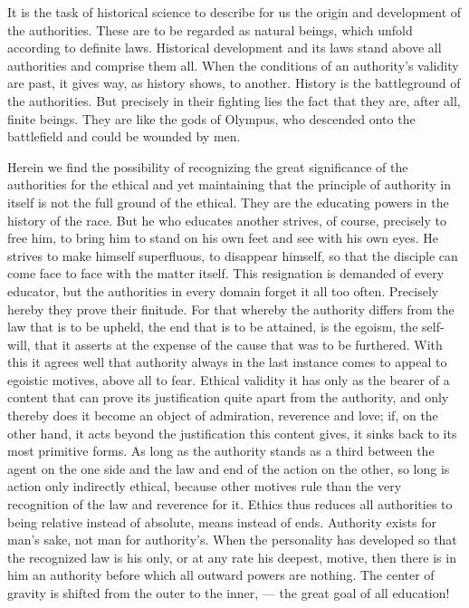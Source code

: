 \documentclass[12pt,a4paper,openany]{book}
\newcommand{\opage}[1]{\marginnote{\footnotesize\textit{[#1]}}}
\begin{document}
It is the task of historical science to \opage{75}describe for us the origin
and development of the authorities. These are to be regarded as natural
beings, which unfold according to definite laws. Historical development and
its laws stand above all authorities and comprise them all. When the
conditions of an authority's validity are past, it gives way, as history
shows, to another. History is the battleground of the authorities. But
precisely in their fighting lies the fact that they are, after all, finite
beings. They are like the gods of Olympus, who descended onto the battlefield
and could be wounded by men.

Herein we find the possibility of recognizing the great significance of the
authorities for the ethical and yet maintaining that the principle of
authority in itself is not the full ground of the ethical. They are the
educating powers in the history of the race. But he who educates another
strives, of course, precisely to free him, to bring him to stand on his own
feet and see with his own eyes. He strives to make himself superfluous, to
disappear himself, so that the disciple can come face to face with the matter
itself. This resignation is demanded of every educator, but the authorities in
every domain forget it all too often. Precisely hereby they prove their
finitude. For that whereby the authority differs from the law that is to be
upheld, the end that is to be attained, is the egoism, the self-will, that it
asserts at the expense of the cause that was to be furthered. With this it
agrees well that authority always in the last instance comes to appeal to
egoistic motives, above all to fear. \opage{76}Ethical validity it has only as
the bearer of a content that can prove its justification quite apart from the
authority, and only thereby does it become an object of admiration, reverence
and love; if, on the other hand, it acts beyond the justification this content
gives, it sinks back to its most primitive forms. As long as the authority
stands as a third between the agent on the one side and the law and end of the
action on the other, so long is action only indirectly ethical, because other
motives rule than the very recognition of the law and reverence for it. Ethics
thus reduces all authorities to being relative instead of absolute, means
instead of ends. Authority exists for man's sake, not man for authority's.
When the personality has developed so that the recognized law is his only, or
at any rate his deepest, motive, then there is in him an authority before
which all outward powers are nothing. The center of gravity is shifted from
the outer to the inner, --- the great goal of all education!
\end{document}

